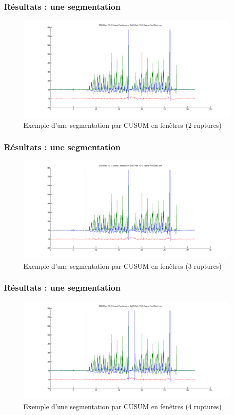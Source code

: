 \documentclass{beamer}
\begin{document}
\begin{frame}
	\frametitle{Résultats : une segmentation}
	\begin{figure}
		\includegraphics[scale=0.3]{seg2_win.png}
		\caption{Exemple d'une segmentation par CUSUM en fenêtres (2 ruptures)}
	\end{figure}
\end{frame}

\begin{frame}
	\frametitle{Résultats : une segmentation}
	\begin{figure}
		\includegraphics[scale=0.3]{seg3_win.png}
		\caption{Exemple d'une segmentation par CUSUM en fenêtres (3 ruptures)}
	\end{figure}
\end{frame}

\begin{frame}
	\frametitle{Résultats : une segmentation}
	\begin{figure}
		\includegraphics[scale=0.3]{seg4_win.png}
		\caption{Exemple d'une segmentation par CUSUM en fenêtres (4 ruptures)}
	\end{figure}
\end{frame}
\end{document}
